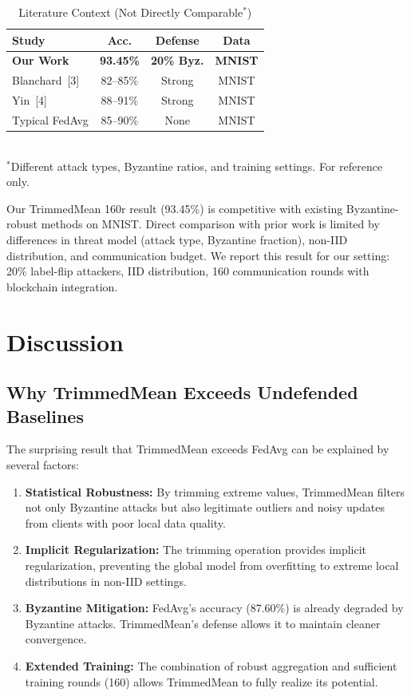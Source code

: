 \documentclass[12pt,a4paper,onecolumn]{article}
\begin{document}
\begin{table}[t]
\caption{Literature Context (Not Directly Comparable$^*$)}
\label{tab:literature_comparison}
\centering
{\scriptsize
\begin{tabular}{lccc}
\toprule
\textbf{Study} & \textbf{Acc.} & \textbf{Defense} & \textbf{Data} \\
\midrule
\textbf{Our Work} & \textbf{93.45\%} & \textbf{20\% Byz.} & \textbf{MNIST} \\
Blanchard~[3] & 82--85\% & Strong & MNIST \\
Yin~[4] & 88--91\% & Strong & MNIST \\
Typical FedAvg & 85--90\% & None & MNIST \\
\bottomrule
\end{tabular}
}
\\[0.05cm]
{\tiny $^*$Different attack types, Byzantine ratios, and training settings. For reference only.}
\end{table}

Our TrimmedMean 160r result (93.45\%) is competitive with existing Byzantine-robust methods on MNIST. Direct comparison with prior work is limited by differences in threat model (attack type, Byzantine fraction), non-IID distribution, and communication budget. We report this result for our setting: 20\% label-flip attackers, IID distribution, 160 communication rounds with blockchain integration.

\section{Discussion}
\label{sec:discussion}

\subsection{Why TrimmedMean Exceeds Undefended Baselines}

The surprising result that TrimmedMean exceeds FedAvg can be explained by several factors:

\begin{enumerate}
    \item \textbf{Statistical Robustness:} By trimming extreme values, TrimmedMean filters not only Byzantine attacks but also legitimate outliers and noisy updates from clients with poor local data quality.
    
    \item \textbf{Implicit Regularization:} The trimming operation provides implicit regularization, preventing the global model from overfitting to extreme local distributions in non-IID settings.
    
    \item \textbf{Byzantine Mitigation:} FedAvg's accuracy (87.60\%) is already degraded by Byzantine attacks. TrimmedMean's defense allows it to maintain cleaner convergence.
    
    \item \textbf{Extended Training:} The combination of robust aggregation and sufficient training rounds (160) allows TrimmedMean to fully realize its potential.
\end{enumerate}
\end{document}
